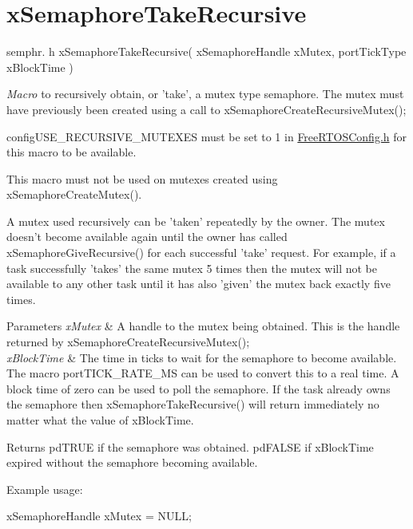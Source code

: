 \hypertarget{group__x_semaphore_take_recursive}{\section{x\-Semaphore\-Take\-Recursive}
\label{group__x_semaphore_take_recursive}
}
semphr. h x\-Semaphore\-Take\-Recursive( x\-Semaphore\-Handle x\-Mutex, port\-Tick\-Type x\-Block\-Time )

{\itshape Macro} to recursively obtain, or 'take', a mutex type semaphore. The mutex must have previously been created using a call to x\-Semaphore\-Create\-Recursive\-Mutex();

config\-U\-S\-E\-\_\-\-R\-E\-C\-U\-R\-S\-I\-V\-E\-\_\-\-M\-U\-T\-E\-X\-E\-S must be set to 1 in \hyperlink{_free_r_t_o_s_config_8h_source}{Free\-R\-T\-O\-S\-Config.\-h} for this macro to be available.

This macro must not be used on mutexes created using x\-Semaphore\-Create\-Mutex().

A mutex used recursively can be 'taken' repeatedly by the owner. The mutex doesn't become available again until the owner has called x\-Semaphore\-Give\-Recursive() for each successful 'take' request. For example, if a task successfully 'takes' the same mutex 5 times then the mutex will not be available to any other task until it has also 'given' the mutex back exactly five times.


\begin{DoxyParams}{Parameters}
{\em x\-Mutex} & A handle to the mutex being obtained. This is the handle returned by x\-Semaphore\-Create\-Recursive\-Mutex();\\
\hline
{\em x\-Block\-Time} & The time in ticks to wait for the semaphore to become available. The macro port\-T\-I\-C\-K\-\_\-\-R\-A\-T\-E\-\_\-\-M\-S can be used to convert this to a real time. A block time of zero can be used to poll the semaphore. If the task already owns the semaphore then x\-Semaphore\-Take\-Recursive() will return immediately no matter what the value of x\-Block\-Time.\\
\hline
\end{DoxyParams}
\begin{DoxyReturn}{Returns}
pd\-T\-R\-U\-E if the semaphore was obtained. pd\-F\-A\-L\-S\-E if x\-Block\-Time expired without the semaphore becoming available.
\end{DoxyReturn}
Example usage\-: 
\begin{DoxyPre}
 xSemaphoreHandle xMutex = NULL;\end{DoxyPre}



